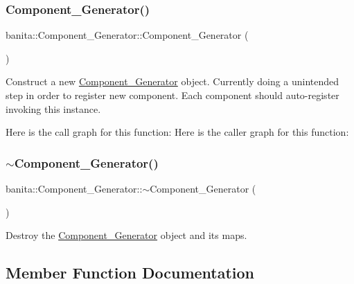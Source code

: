 \subsubsection{\texorpdfstring{Component\_Generator()}{Component\_Generator()}}
{\footnotesize\ttfamily banita\+::\+Component\+\_\+\+Generator\+::\+Component\+\_\+\+Generator (\begin{DoxyParamCaption}{ }\end{DoxyParamCaption})\hspace{0.3cm}{\ttfamily [inline]}}



Construct a new \mbox{\hyperlink{classbanita_1_1_component___generator}{Component\+\_\+\+Generator}} object. Currently doing a unintended step in order to register new component. Each component should auto-\/register invoking this instance. 

Here is the call graph for this function\+:
Here is the caller graph for this function\+:
\mbox{\label{classbanita_1_1_component___generator_a7d43e1dbee3a0addf85bd96422bef52d}} 
\subsubsection{\texorpdfstring{$\sim$Component\_Generator()}{~Component\_Generator()}}
{\footnotesize\ttfamily banita\+::\+Component\+\_\+\+Generator\+::$\sim$\+Component\+\_\+\+Generator (\begin{DoxyParamCaption}{ }\end{DoxyParamCaption})\hspace{0.3cm}{\ttfamily [inline]}}



Destroy the \mbox{\hyperlink{classbanita_1_1_component___generator}{Component\+\_\+\+Generator}} object and it\textquotesingle{}s maps. 



\subsection{Member Function Documentation}
\mbox{\label{classbanita_1_1_component___generator_ad8a76cb6dfb2b8667d412b0b014ca75d}} 
